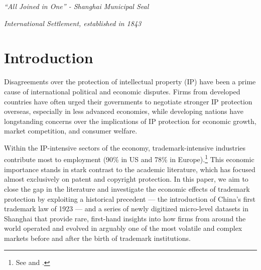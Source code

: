 \documentclass[12pt]{article}
\begin{document}
\newpage

\hspace{-0.5cm}{``Omnia Juncta in Uno.''}
 
\hspace{6cm}\textit{``All Joined in One'' - Shanghai Municipal Seal}

\hspace{6cm}\textit{International Settlement, established in 1843}

\vspace{0.5cm}

\section{Introduction} \label{sec:introduction}

Disagreements over the protection of intellectual property (IP) have been a prime cause of international political and economic disputes. %
Firms from developed countries have often urged their governments to negotiate stronger IP protection overseas, especially in less advanced economies, while developing nations have longstanding concerns over the implications of IP protection for economic growth, market competition, and consumer welfare. %

Within the IP-intensive sectors of the economy, trademark-intensive industries contribute most to employment (90\% in US and 78\% in Europe).\footnote{See \cite{uspto2016} and \cite{euipo2019}.} This economic importance stands in stark contrast to the academic literature, which has focused almost exclusively on patent and copyright protection. In this paper, we aim to close the gap in the literature and investigate  the economic effects of trademark protection by exploiting a historical precedent — the introduction of China’s first trademark law of 1923 — and a series of newly digitized micro-level datasets in Shanghai that provide rare, first-hand insights into how firms from around the world operated and evolved in arguably one of the most volatile and complex markets before and after the birth of trademark institutions. 
\end{document}
